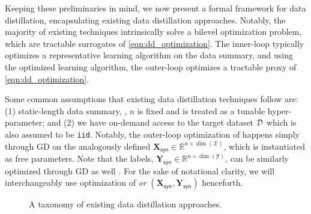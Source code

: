 \documentclass[10pt]{article} %
\begin{document}
Keeping these preliminaries in mind, we now present a formal framework for data distillation, encapsulating existing data distillation approaches. Notably, the majority of existing techniques intrinsically solve a bilevel optimization problem, which are tractable surrogates of \cref{eqn:dd_optimization}. The inner-loop typically optimizes a representative learning algorithm on the data summary, and using the optimized learning algorithm, the outer-loop optimizes a tractable proxy of \cref{eqn:dd_optimization}. 

Some common assumptions that existing data distillation techniques follow are: (1) static-length data summary, \ie, $n$ is fixed and is treated as a tunable hyper-parameter; and (2) we have on-demand access to the target dataset $\mathcal{D}$ which is also assumed to be \texttt{iid}. Notably, the outer-loop optimization of \distill happens simply through GD on the analogously defined $\mathbf{X}_{\mathsf{syn}} \in \mathbb{R}^{n \times \dim(\mathcal{X})}$, which is instantiated as free parameters. Note that the labels, $\mathbf{Y}_{\mathsf{syn}} \in \mathbb{R}^{n \times \dim(\mathcal{Y})}$, can be similarly optimized through GD as well \citep{label_solve}. For the sake of notational clarity, we will interchangeably use optimization of \distill \emph{or} $(\mathbf{X}_{\mathsf{syn}}, \mathbf{Y}_{\mathsf{syn}})$ henceforth.

\begin{figure}[t!] \centering
    \renewcommand\figurename{\href{https://www.noveens.com/images/dd_survey/taxonomy.pdf}{[HQ Image Link]} Figure}
    \caption{A taxonomy of existing data distillation approaches.}
    \label{fig:taxonomy}
    \vspace{-4pt}
\end{figure} 
\end{document}
